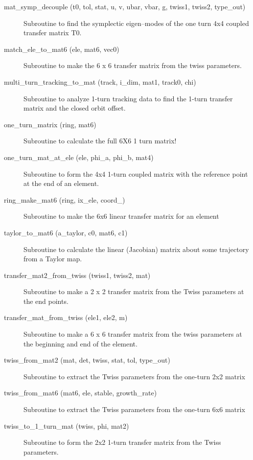 \begin{description}
\item[mat\_symp\_decouple (t0, tol, stat, u, v, ubar, vbar, g, twiss1, twiss2, type\_out)] \Newline
Subroutine to find the symplectic eigen--modes of the one turn 4x4 coupled 
transfer matrix T0. 

\item[match\_ele\_to\_mat6 (ele, mat6, vec0)] \Newline 
Subroutine to make the 6 x 6 transfer matrix from the twiss parameters.

\item[multi\_turn\_tracking\_to\_mat (track, i\_dim, mat1, track0, chi)] \Newline
Subroutine to analyze 1-turn tracking data to find the 1-turn transfer matrix 
and the closed orbit offset.

\item[one\_turn\_matrix (ring, mat6)] \Newline
Subroutine to calculate the full 6X6 1 turn matrix! 

\item[one\_turn\_mat\_at\_ele (ele, phi\_a, phi\_b, mat4)] \Newline
Subroutine to form the 4x4 1-turn coupled matrix with the reference point 
at the end of an element. 

\item[ring\_make\_mat6 (ring, ix\_ele, coord\_)] \Newline
Subroutine to make the 6x6 linear transfer matrix for an element 

\item[taylor\_to\_mat6 (a\_taylor, c0, mat6, c1)] \Newline
Subroutine to calculate the linear (Jacobian) matrix about some trajectory from a Taylor map. 

\item[transfer\_mat2\_from\_twiss (twiss1, twiss2, mat)] \Newline
Subroutine to make a 2 x 2 transfer matrix from the Twiss parameters at the end points. 

\item[transfer\_mat\_from\_twiss (ele1, ele2, m)] \Newline 
Subroutine to make a 6 x 6 transfer matrix from the twiss parameters
at the beginning and end of the element.

\item[twiss\_from\_mat2 (mat, det, twiss, stat, tol, type\_out)] \Newline
Subroutine to extract the Twiss parameters from the one-turn 2x2 matrix 

\item[twiss\_from\_mat6 (mat6, ele, stable, growth\_rate)] \Newline
Subroutine to extract the Twiss parameters from the one-turn 6x6 matrix 

\item[twiss\_to\_1\_turn\_mat (twiss, phi, mat2)] \Newline
Subroutine to form the 2x2 1-turn transfer matrix from the Twiss parameters. 

\end{description}

